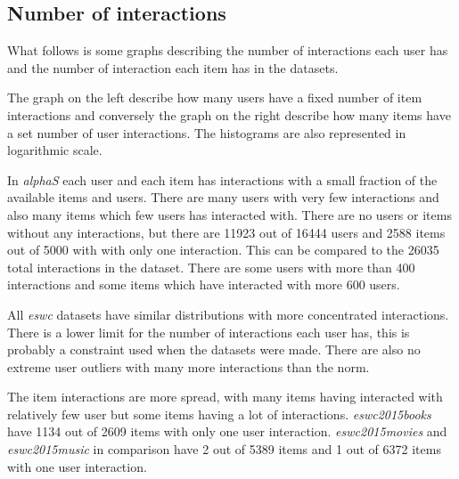 
\subsection{Number of interactions}\label{sec:result:interactions}

What follows is some graphs describing the number of interactions each user has and the number of interaction each item has in the datasets.

The graph on the left describe how many users have a fixed number of item interactions and conversely the graph on the right describe how many items have a set number of user interactions. The histograms are also represented in logarithmic scale.

\FloatBarrier


In \textit{alphaS} each user and each item has interactions with a small fraction of the available items and users. There are many users with very few interactions and also many items which few users has interacted with. There are no users or items without any interactions, but there are 11923 out of 16444 users and 2588 items out of 5000 with with only one interaction. This can be compared to the 26035 total interactions in the dataset. There are some users with more than 400 interactions and some items which have interacted with more 600 users.


\newpage




\FloatBarrier

All \textit{eswc} datasets have similar distributions with more concentrated interactions. There is a lower limit for the number of interactions each user has, this is probably a constraint used when the datasets were made.
There are also no extreme user outliers with many more interactions than the norm.

The item interactions are more spread, with many items having interacted with relatively few user but some items having a lot of interactions. \textit{eswc2015books} have 1134 out of 2609 items with only one user interaction. \textit{eswc2015movies} and \textit{eswc2015music} in comparison have 2 out of 5389 items and 1 out of 6372 items with one user interaction.

